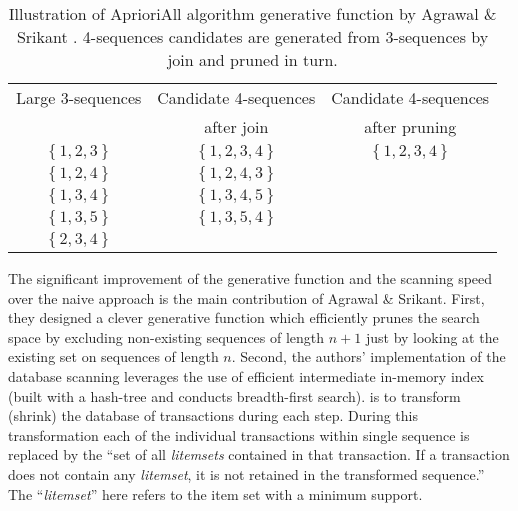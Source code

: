 \begin{table}
\begin{center}
    \begin{tabular}{ | c | c | c |}
    \hline
    Large 3-sequences & Candidate 4-sequences                     & Candidate 4-sequences \\ 
                      & after join                                & after pruning \\ 
    \hline
    $\left\{ 1, 2, 3 \right\} $ & $ \left\{ 1, 2, 3, 4 \right\} $ & $ \left\{ 1, 2, 3, 4 \right\} $ \\ 
    \hline
    $\left\{ 1, 2, 4 \right\} $ & $ \left\{ 1, 2, 4, 3 \right\} $ & \\ 
    \hline
    $\left\{ 1, 3, 4 \right\} $ & $ \left\{ 1, 3, 4, 5 \right\} $ & \\ 
    \hline
    $\left\{ 1, 3, 5 \right\} $ & $ \left\{ 1, 3, 5, 4 \right\} $ & \\ 
    \hline
    $\left\{ 2, 3, 4 \right\} $  &                                & \\ 
    \hline
    \end{tabular}
    \caption{Illustration of AprioriAll algorithm generative function by Agrawal \& Srikant \cite{citeulike:775528}. 4-sequences candidates are generated from 3-sequences by join and pruned in turn.}
    \label{fig:apriori}
    \end{center}
\end{table}

The significant improvement of the generative function and the scanning speed over the naive approach is the main contribution of Agrawal \& Srikant. First, they designed a clever generative function which efficiently prunes the search space by excluding non-existing sequences of length $n+1$ just by looking at the existing set on sequences of length $n$. Second, the authors' implementation of the database scanning leverages the use of efficient intermediate in-memory index (built with a hash-tree and conducts breadth-first search). is to transform (shrink) the database of transactions during each step. During this transformation each of the individual transactions within single sequence is replaced by the ``set of all \textit{litemsets} contained in that transaction. If a transaction does not contain any \textit{litemset}, it is not retained in the transformed sequence.'' The ``\textit{litemset}'' here refers to the item set with a minimum support.

